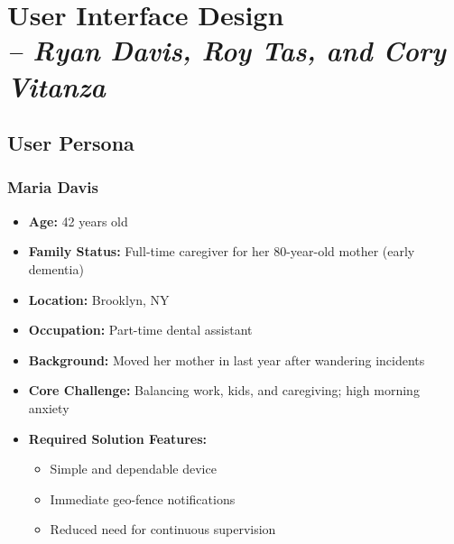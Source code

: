 \chapter{User Interface Design \\
\small{\textit{-- Ryan Davis, Roy Tas, and Cory Vitanza}}
\label{Chapter::UserInterfaceDesign}}

\section{User Persona}

\subsection*{Maria Davis}
\begin{itemize}[leftmargin=2em]
    \item \textbf{Age:} 42 years old
    \item \textbf{Family Status:} Full-time caregiver for her 80-year-old mother (early dementia)
    \item \textbf{Location:} Brooklyn, NY
    \item \textbf{Occupation:} Part-time dental assistant
    \item \textbf{Background:} Moved her mother in last year after wandering incidents
    \item \textbf{Core Challenge:} Balancing work, kids, and caregiving; high morning anxiety
    \item \textbf{Required Solution Features:}
        \begin{itemize}
            \item Simple and dependable device
            \item Immediate geo-fence notifications
            \item Reduced need for continuous supervision
        \end{itemize}
\end{itemize}

